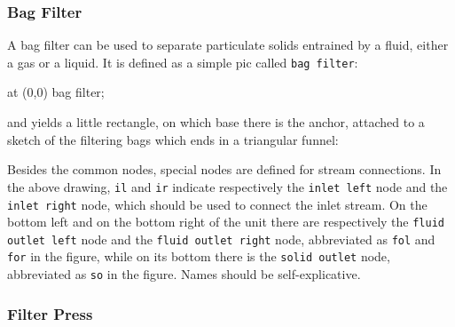 \documentclass[12pt]{article}						%
\newcommand*{\chpn}[1]{\texttt{#1}}				%
\newcommand*{\chpp}[1]{\texttt{#1}}				%
\begin{document}
\subsubsection{Bag Filter}

A bag filter can be used to separate particulate solids entrained by a fluid,
either a gas or a liquid. It is defined as a simple pic called \chpp{bag filter}:
\begin{chpcode}
	\pic at (0,0) {bag filter};
\end{chpcode}
and yields a little rectangle, on which base there is the anchor, attached to a
sketch of the filtering bags which ends in a triangular funnel:
\begin{center}
\end{center}

Besides the common nodes, special nodes are defined for stream connections. In
the above drawing, \chpn{il} and \chpn{ir} indicate respectively the
\chpn{inlet left} node and the \chpn{inlet right} node, which should be used to
connect the inlet stream. On the bottom left and on the bottom right of the unit
there are respectively the \chpn{fluid outlet left} node and the
\chpn{fluid outlet right} node, abbreviated as \chpn{fol} and \chpn{for} in the
figure, while on its bottom there is the \chpn{solid outlet} node, abbreviated as
\chpn{so} in the figure. Names should be self-explicative.

\subsubsection{Filter Press}
\end{document}
